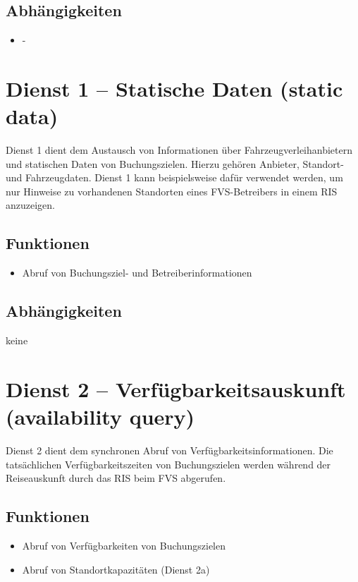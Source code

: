 \subsection*{Abhängigkeiten}
\begin{itemize}
\item -
\end{itemize}


\section{Dienst 1 -- Statische Daten (static data)}
\label{sec:Hierachiemodell:Dienst1}

Dienst 1 dient dem Austausch von Informationen über Fahrzeugverleihanbietern und statischen Daten von Buchungszielen. Hierzu gehören Anbieter, Standort- und Fahrzeugdaten. Dienst 1 kann beispielsweise dafür verwendet werden, um nur Hinweise zu vorhandenen Standorten eines FVS-Betreibers in einem RIS anzuzeigen.

\subsection*{Funktionen}
\begin{itemize}
\item Abruf von Buchungsziel- und Betreiberinformationen
\end{itemize}

\subsection*{Abhängigkeiten}
keine 

\section{Dienst 2 -- Verfügbarkeitsauskunft (availability query) }
\label{sec:Hierachiemodell:Dienst2}
Dienst 2 dient dem synchronen Abruf von Verfügbarkeitsinformationen. Die tatsächlichen Verfügbarkeitszeiten von Buchungszielen werden während der Reiseauskunft durch das RIS beim FVS abgerufen. 

\subsection*{Funktionen}
\begin{itemize}
\item Abruf von Verfügbarkeiten von Buchungszielen
\item Abruf von Standortkapazitäten (Dienst 2a)
\end{itemize}

